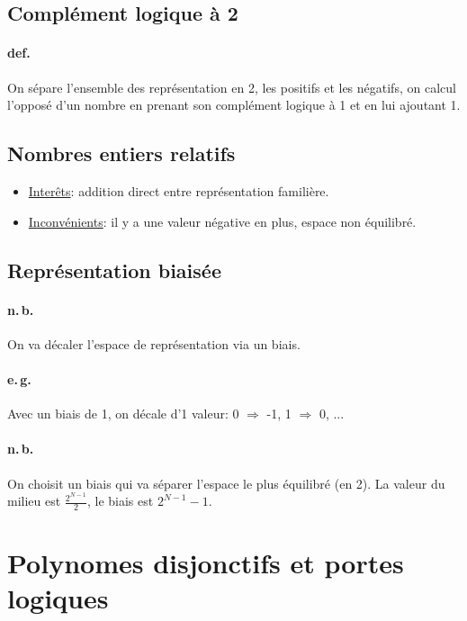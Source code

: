 \documentclass{report}
\begin{document}
  \subsection{Complément logique à 2}

    \paragraph{def.} On sépare l'ensemble des représentation en 2, les positifs et les négatifs, on calcul l'opposé d'un nombre en prenant son complément logique à 1 et en lui ajoutant 1.

  \subsection{Nombres entiers relatifs}

    \begin{itemize}
      \item \underline{Interêts}: addition direct entre représentation familière.
      \item \underline{Inconvénients}: il y a une valeur négative en plus, espace non équilibré.
    \end{itemize}

  \subsection{Représentation biaisée}

    \paragraph{n.\,b.} On va décaler l'espace de représentation via un biais.

    \paragraph{e.\,g.} Avec un biais de 1, on décale d'1 valeur: 0 $\Rightarrow$ -1, 1 $\Rightarrow$ 0, ...

    \paragraph{n.\,b.} On choisit un biais qui va séparer l'espace le plus équilibré (en 2). La valeur du milieu est $\frac{2^{N-1}}{2}$, le biais est $2^{N-1} - 1$.

\section{Polynomes disjonctifs et portes logiques}
\end{document}
